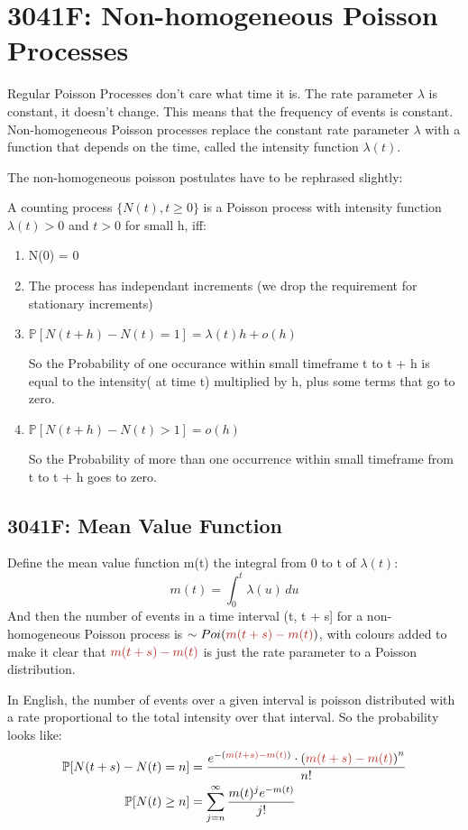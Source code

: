 \section{3041F: Non-homogeneous Poisson Processes}
Regular Poisson Processes don't care what time it is. 
The rate parameter \(\lambda\) is constant, it doesn't change. This means that the frequency of events is constant.
Non-homogeneous Poisson processes replace the constant rate parameter \(\lambda\) with a function that depends on the time, called the intensity function \(\lambda(t)\).

The non-homogeneous poisson postulates have to be rephrased slightly:

A counting process \(\{N(t), t \ge 0\}\) is a Poisson process with intensity function
\( \lambda(t) > 0 \) and \(t > 0 \) for small h, iff:
\begin{enumerate}
    \item N(0) = 0
    \item The process has independant increments (we drop the requirement for stationary increments)
    \item \(\mathbb{P}[N(t + h) - N(t) = 1] = \lambda(t) h + o(h)\)

        So the Probability of one occurance within small timeframe t to t + h is equal to the intensity( at time t) multiplied by h, plus some terms that go to zero.
    \item \(\mathbb{P}[N(t + h) - N(t) > 1] = o(h)\)

        So the Probability of more than one occurrence within small timeframe from t to t + h goes to zero.
\end{enumerate}
\subsection{3041F: Mean Value Function}
Define the mean value function m(t) the integral from 0 to t of \(\lambda(t)\):
\begin{equation*}
    m(t) = \int_{0}^{t} \lambda(u) \, du
\end{equation*}
And then the number of events in a time interval (t, t + s] for a
non-homogeneous Poisson process is $\sim Poi({\color{BrickRed}{m(t + s) -
        m(t)}})$, with colours added to make it clear that ${\color{BrickRed}{m(t +
s) - m(t)}}$ is just the rate parameter to a Poisson distribution.


In English, the number of events over a given interval is poisson 
distributed with a rate proportional to the total intensity over that interval. So the probability looks like:
\begin{equation*}
    \begin{aligned}
        \mathbb{P}[N(t + s) - N(t) = n] &= \frac{
            e^{-\left({\color{BrickRed}{m(t+s) - m(t)}}\right)} 
            \cdot \left( {\color{BrickRed}{m(t+s) - m(t)}}\right)^n
        }{n!} \\
            \mathbb{P}[N(t) \ge n] &= \sum_{j=n}^{\infty} \frac{ m(t)^j e^{-m(t)}
            }{ j!  } \\
    \end{aligned}
\end{equation*}
